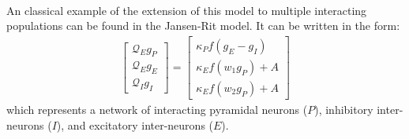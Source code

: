 \documentclass{article}
\begin{document}
\paragraph{}
An classical example of the extension of this model to multiple interacting populations can be found in the Jansen-Rit model. It can be written in the form:
\begin{align*}
\begin{bmatrix}
\mathcal{Q}_{E}g_{P} \\
\mathcal{Q}_{E}g_{E} \\
\mathcal{Q}_{I}g_{I}
\end{bmatrix} = 
\begin{bmatrix}
\kappa_{P} f( g_{E} - g_{I} ) \\
\kappa_{E} f( w_{1} g_{P} ) + A \\
\kappa_{E} f( w_{2} g_{P} ) + A
\end{bmatrix}
\end{align*}
which represents a network of interacting pyramidal neurons ($P$), inhibitory inter-neurons ($I$), and excitatory inter-neurons ($E$).
\end{document}
